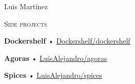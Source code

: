 \documentclass[12pt]{article}
\begin{document}
\begin{cv}{Luis Mart\'inez}
\begin{minipage}[t]{0.35\textwidth}
    \vspace{0.25em}
    \begin{minipage}{\linewidth}
      \textrm{\textsc{\Large{Side projects}}}
      \newline
      \parbox[t]{\linewidth}{
        \textbf{Dockershelf} • \href{https://github.com/Dockershelf/dockershelf}{Dockershelf/dockershelf}\\
      }
      \parbox[t]{\linewidth}{
        \textbf{Agoras} • \href{https://github.com/LuisAlejandro/agoras}{LuisAlejandro/agoras}\\
      }
      \parbox[t]{\linewidth}{
        \textbf{Spices} • \href{https://github.com/LuisAlejandro/spices}{LuisAlejandro/spices}\\
      }
    \end{minipage}
  
  \end{minipage}\hspace{0.5cm}
  \begin{minipage}[t]{0.55\textwidth}
    \vspace{0.125em}


\end{minipage}
\end{cv}
\end{document}
